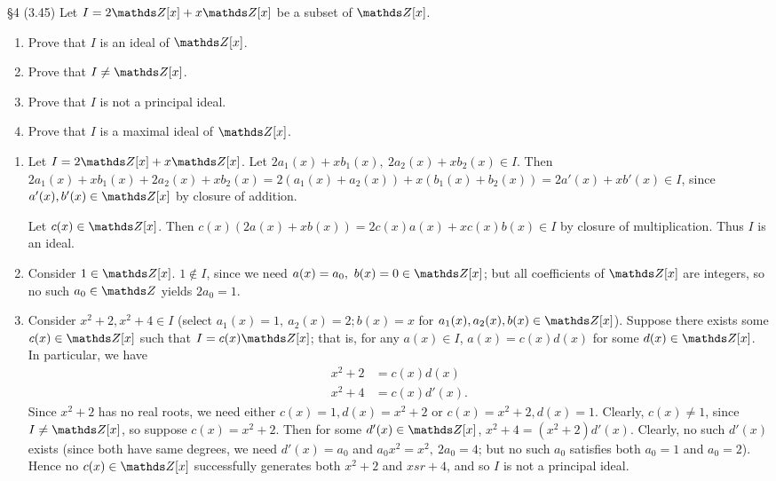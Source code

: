 \documentclass{homework}
\begin{document}
\begin{problem}{\S 4}
  (3.45) Let $I=2\Z[x]+x\Z[x]$ be a subset of $\Z[x]$.
  \begin{enumerate}[label=(\alph*)]
    \item Prove that $I$ is an ideal of $\Z[x]$.
    \item Prove that $I\neq \Z[x]$.
    \item Prove that $I$ is not a principal ideal.
    \item Prove that $I$ is a maximal ideal of $\Z[x]$.
  \end{enumerate}
\end{problem}

\begin{solution}
  \begin{enumerate}[label=(\alph*)]
    \item Let $I=2\Z[x]+x\Z[x]$. Let $2a_1(x)+xb_1(x),\ 2a_2(x)+xb_2(x)\in I$. Then
      $2a_1(x)+xb_1(x)+2a_2(x)+xb_2(x)=2(a_1(x)+a_2(x))+x(b_1(x)+b_2(x))=2a'(x)+xb'(x)\in I$, since
      $a'(x),b'(x)\in \Z[x]$ by closure of addition.
      
      Let $c(x)\in \Z[x]$. Then $c(x)(2a(x)+xb(x))=2c(x)a(x)+xc(x)b(x)\in I$ by closure of
      multiplication. Thus $I$ is an ideal.
    \item Consider $1\in \Z[x]$. $1\not\in I$, since we need $a(x)=a_0,\ b(x)=0\in \Z[x]$; but all
      coefficients of $\Z[x]$ are integers, so no such $a_0\in \Z$ yields $2a_0=1$.
    \item Consider $x^2+2,x^2+4\in I$ (select $a_1(x)=1,\ a_2(x)=2; b(x)=x$ for
      $a_1(x),a_2(x),b(x)\in \Z[x]$). Suppose there exists some $c(x)\in \Z[x]$ such that
      $I=c(x)\Z[x]$; that is, for any $a(x)\in I$, $a(x)=c(x)d(x)$ for some $d(x)\in \Z[x]$. In
      particular, we have
      \begin{align*}
        x^2+2&= c(x)d(x) \\
        x^2+4&= c(x)d'(x)
      .\end{align*} Since $x^2+2$ has no real roots, we need either $c(x)=1, d(x)=x^2+2$ or
      $c(x)=x^2+2, d(x)=1$. Clearly, $c(x)\neq 1$, since $I\neq \Z[x]$, so suppose $c(x)=x^2+2$.
      Then for some $d'(x)\in \Z[x]$, $x^2+4=(x^2+2)d'(x)$. Clearly, no such $d'(x)$ exists (since
      both have same degrees, we need $d'(x)=a_0$ and $a_0x^2=x^2,\ 2a_0=4$; but no such $a_0$
      satisfies both $a_0=1$ and $a_0=2$). Hence no $c(x)\in \Z[x]$ successfully generates both
      $x^2+2$ and $xsr+4$, and so $I$ is not a principal ideal.


\end{enumerate}
\end{solution}
\end{document}

